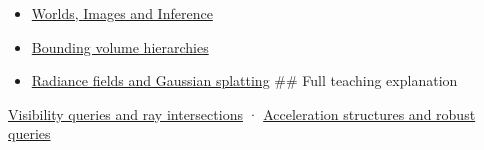 \begin{itemize}
\item
  \href{Continuous\%20Notes/University\%20-\%20Worlds,\%20Images\%20and\%20Inference\%20-\%20Graphics,\%20Vision\%20and\%20Photography}{Worlds, Images and Inference}
\item
  \hyperref[appendix-0b426c47dd78]{Bounding volume hierarchies}
\item
  \hyperref[appendix-c5b332e400e7]{Radiance fields and Gaussian splatting} \#\# Full teaching explanation
\end{itemize}

\href{Continuous\%20Notes/University\%20-\%20Worlds,\%20Images\%20and\%20Inference\%20-\%20Graphics,\%20Vision\%20and\%20Photography\#Visibility\%20queries\%20and\%20ray\%20intersections}{Visibility queries and ray intersections} · \href{Continuous\%20Notes/University\%20-\%20Worlds,\%20Images\%20and\%20Inference\%20-\%20Graphics,\%20Vision\%20and\%20Photography\#Acceleration\%20structures\%20and\%20robust\%20queries}{Acceleration structures and robust queries}

